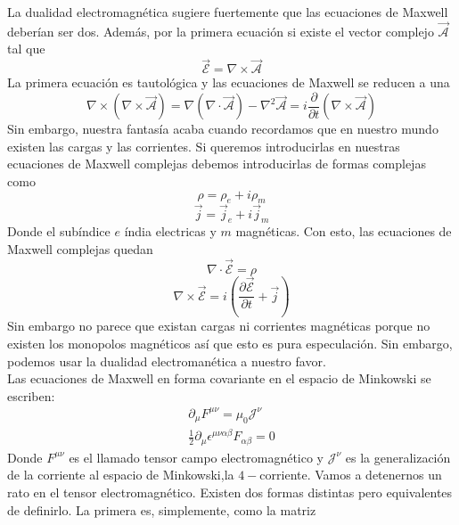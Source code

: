 \documentclass[12pt]{article}
\begin{document}
La dualidad electromagnética sugiere fuertemente que las ecuaciones de Maxwell deberían ser dos. Además, por la primera ecuación si existe el vector complejo $\vec {\mathcal{A}}$ tal que 
\begin{equation}
    \vec{\mathcal{E}}= \nabla \times \vec {\mathcal{A}}
\end{equation}
La primera ecuación es tautológica y las ecuaciones de Maxwell se reducen a una 
\begin{equation}
    \nabla\times (\nabla\times  \vec {\mathcal{A}}) =\nabla (\nabla \cdot \vec {\mathcal{A}}) -\nabla^2 \vec {\mathcal{A}} =i\frac{\partial }{\partial t}( \nabla \times \vec {\mathcal{A}})
\end{equation}
Sin embargo, nuestra fantasía acaba cuando recordamos que en nuestro mundo existen las cargas y las corrientes. Si queremos introducirlas en nuestras ecuaciones de Maxwell complejas debemos introducirlas de formas complejas como
\begin{equation}
    \rho =\rho_e+ i\rho_m
\end{equation}
\begin{equation}
    \vec j =\vec j_e+i\vec j_m
\end{equation}
Donde el subíndice $e$ índia electricas y $m$ magnéticas. Con esto, las ecuaciones de Maxwell complejas quedan 
\begin{equation}
    \nabla \cdot \vec{\mathcal{E}}=\rho 
\end{equation}
\begin{equation}
    \nabla \times \vec{\mathcal{E}} =i\left(\frac{\partial \vec{\mathcal{E}}}{\partial t}+\vec j\right)
\end{equation}
Sin embargo no parece que existan cargas ni corrientes magnéticas porque no existen los monopolos magnéticos así que esto es pura especulación. Sin embargo, podemos usar la dualidad electromanética a  nuestro favor. \\
Las ecuaciones de Maxwell en forma covariante en el espacio de Minkowski se escriben:
\begin{equation}
    \begin{split}
        \partial_\mu F^{\mu \nu}=\mu_0 \mathcal{J}^\nu  \\
        \frac{1}{2}\partial_\mu \epsilon^{\mu \nu \alpha \beta} F_{\alpha \beta}= 0
    \end{split}
\end{equation}
Donde $F^{\mu \nu}$ es el llamado tensor campo electromagnético y $\mathcal{J}^\nu$ es la generalización de la corriente al espacio de Minkowski,la $4-$corriente. Vamos a detenernos un rato en el tensor electromagnético. Existen dos formas distintas pero equivalentes de definirlo. La primera es, simplemente, como la matriz 
\end{document}
